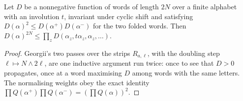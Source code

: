 \begin{lemma}[Georgii (17.9)]
    \label{lem:rp-17-9}
    \leanok

    Let $D$ be a nonnegative function of words of length $2N$ over a finite alphabet with an
    involution $t$, invariant under cyclic shift and satisfying
    $D(\alpha)^2 \leq D(\alpha^+)D(\alpha^-)$ for the two folded words. Then
    $D(\alpha)^{2N} \leq \prod_{z} D(\alpha_z, t\alpha_z, \alpha_z, \ldots)$.
\end{lemma}
\begin{proof}
    \leanok
    Georgii's two passes over the strips $R_{a,\ell}$, with the doubling step
    $\ell \mapsto N \wedge 2\ell$, are one inductive argument run twice: once to see that
    $D > 0$ propagates, once at a word maximising $D$ among words with the same letters. The
    normalising weights obey the exact identity
    $\prod Q(\alpha^+)\prod Q(\alpha^-) = (\prod Q(\alpha))^2$.
\end{proof}

